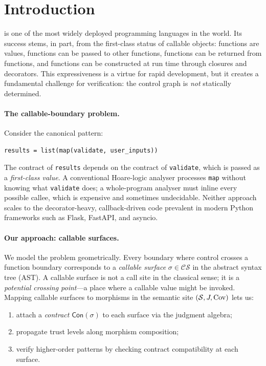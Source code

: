 \documentclass[11pt]{article}
\newcommand{\CS}{\mathcal{CS}}                 %
\newcommand{\surf}{\sigma}                     %
\newcommand{\Contract}{\mathsf{Con}}           %
\begin{document}
\newpage

\section{Introduction}\label{sec:intro}

\Python{} is one of the most widely deployed programming languages in
the world.  Its success stems, in part, from the first-class status of
callable objects: functions are values, functions can be passed to
other functions, functions can be returned from functions, and
functions can be constructed at run time through closures and
decorators.  This expressiveness is a virtue for rapid development,
but it creates a fundamental challenge for verification: the control
graph is \emph{not} statically determined.

\paragraph{The callable-boundary problem.}
Consider the canonical pattern:
\begin{lstlisting}[style=jugeo-python]
results = list(map(validate, user_inputs))
\end{lstlisting}
The contract of \texttt{results} depends on the contract of
\texttt{validate}, which is passed as a \emph{first-class value}.
A conventional Hoare-logic analyser processes \texttt{map} without
knowing what \texttt{validate} does; a whole-program analyser must
inline every possible callee, which is expensive and sometimes
undecidable.  Neither approach scales to the decorator-heavy,
callback-driven code prevalent in modern Python frameworks such as
Flask, FastAPI, and asyncio.

\paragraph{Our approach: callable surfaces.}
We model the problem geometrically.  Every boundary where control
crosses a function boundary corresponds to a \emph{callable surface}
$\surf \in \CS$ in the abstract syntax tree (AST).  A callable
surface is not a call site in the classical sense; it is a
\emph{potential crossing point}---a place where a callable value
might be invoked.  Mapping callable surfaces to morphisms in the
\JuGeo{} semantic site $(\mathcal{S}, J, \mathrm{Cov})$ lets us:
\begin{enumerate}
  \item attach a \emph{contract} $\Contract(\surf)$ to each surface
        via the judgment algebra;
  \item propagate trust levels along morphism composition;
  \item verify higher-order patterns by checking contract
        compatibility at each surface.
\end{enumerate}
\end{document}
